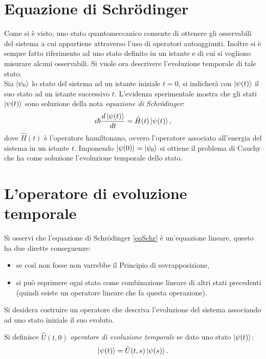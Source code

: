 \section{Equazione di Schrödinger}
Come si è visto, uno stato quantomeccanico consente di ottenere gli osservabili del sistema a cui appartiene attraverso l'uso di operatori autoaggiunti. Inoltre si è sempre fatto riferimento ad uno stato definito in un istante e di cui si vogliono misurare alcuni osservabili. Si vuole ora descrivere l'evoluzione temporale di tale stato.\\

Sia $\ket{\psi_0}$ lo stato del sistema ad un istante iniziale $t=0$, si indicherà con $\ket{\psi(t)}$ il suo stato ad un istante successivo $t$. L'evidenza sperimentale mostra che gli stati $\ket{\psi(t)}$ sono soluzione della nota \emph{equazione di Schrödinger}:
\begin{equation}
    i\hslash\frac{d\ket{\psi(t)}}{dt}=\hat H(t)\ket{\psi(t)},\label{eqSchr}
\end{equation}
dove $\hat H(t)$ è l'operatore hamiltonano, ovvero l'operatore associato all'energia del sistema in un istante $t$. Imponendo $\ket{\psi(0)}=\ket{\psi_0}$ si ottiene il problema di Cauchy che ha come soluzione l'evoluzione temporale dello stato.
\section{L'operatore di evoluzione temporale}
Si osservi che l'equazione di Schrödinger \eqref{eqSchr} è un'equazione lineare, questo ha due dirette conseguenze:
\begin{itemize}
    \item se così non fosse non varrebbe il Principio di sovrapposizione,
    \item si può esprimere ogni stato come combinazione lineare di altri stati precedenti (quindi esiste un operatore lineare che fa questa operazione).
\end{itemize}
Si desidera costruire un operatore che descriva l'evoluzione del sistema associando ad uno stato iniziale il suo evoluto.
\begin{definition}
    Si definisce $\hat U(t,0)$ \emph{operatore di evoluzione temporale} se dato uno stato $\ket{\psi(t)}$:
    \begin{equation*}
        \ket{\psi(t)}=\hat U(t,s)\ket{\psi(s)}.
    \end{equation*}
\end{definition}
